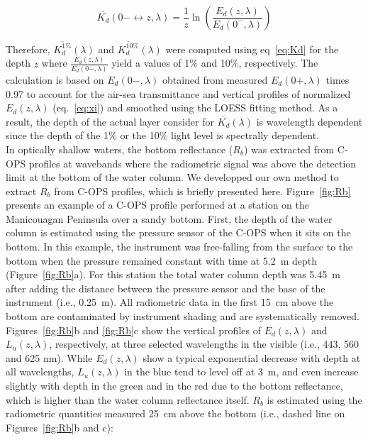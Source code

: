 \documentclass[essd, manuscript]{copernicus}
\begin{document}
\begin{equation}
    \overline{K_d}(0- \leftrightarrow z, \lambda) = \frac{1}{z}\ln \left( \frac{E_d(z, \lambda)}{E_d(0^-, \lambda)} \right)
    \label{eq:Kd}
\end{equation}

Therefore, $\overline{K_d^{1\%}}(\lambda)$ and $\overline{K_d^{10\%}}(\lambda)$ were computed using eq~\ref{eq:Kd} for the depth $z$ where $\frac{E_d(z,\lambda)}{E_d(0-, \lambda)}$ yield a values of 1\% and 10\%, respectively. The calculation is based on $E_d(0-, \lambda)$ obtained from measured $E_d(0+, \lambda)$ times 0.97 to account for the air-sea transmittance \citep{Mueller2003} and vertical profiles of normalized $E_d(z, \lambda)$ (eq.~\ref{eq:xi}) and smoothed using the LOESS fitting method. As a result, the depth of the actual layer consider for $\overline{K_d}(\lambda)$ is wavelength dependent since the depth of the 1\% or the 10\% light level is spectrally dependent. \\ 

In optically shallow waters, the bottom reflectance ($R_b$) was extracted from C-OPS profiles at wavebands where the radiometric signal was above the detection limit at the bottom of the water column. We developped our own method to extract $R_b$ from C-OPS profiles, which is briefly presented here.   Figure~\ref{fig:Rb} presents an example of a C-OPS profile performed at a station on the Manicouagan Peninsula over a sandy bottom. First, the depth of the water column is estimated using the pressure sensor of the C-OPS when it sits on the bottom. In this example, the instrument was free-falling from the surface to the bottom when the pressure remained constant with time at 5.2~m depth (Figure~\ref{fig:Rb}a). For this station the total water column depth was 5.45~m after adding the distance between the pressure sensor and the base of the instrument (i.e., 0.25~m). All radiometric data in the first 15~cm above the bottom are contaminated by instrument shading and are systematically removed. Figures~\ref{fig:Rb}b and \ref{fig:Rb}c show the vertical profiles of $E_d(z, \lambda)$ and $L_u(z, \lambda)$, respectively, at three selected wavelengths in the visible (i.e., 443, 560 and 625 nm). While $E_d(z, \lambda)$ show a typical exponential decrease with depth at all wavelengths,  $L_u(z, \lambda)$ in the blue tend to level off at 3~m, and even increase slightly with depth in the green and in the red due to the bottom reflectance, which is higher than the water column reflectance itself. $R_b$ is estimated using the radiometric quantities measured 25~cm above the bottom (i.e., dashed line on Figures~\ref{fig:Rb}b and c):
\end{document}
